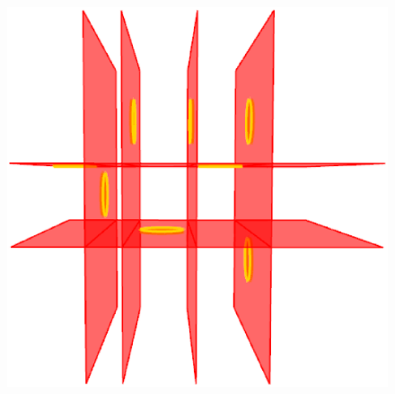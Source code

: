 \begin{figure} [htbp]
{\begin{minipage}[b]{0.3\textwidth}
      \includegraphics[scale=0.16]{figs/f3.surf-end-2.eps}%
    \end{minipage}}
\end{figure}
